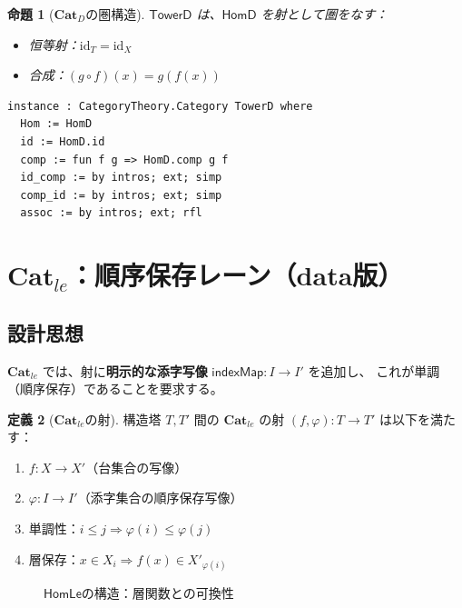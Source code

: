\documentclass[a4paper,11pt]{ltjsarticle}
\theoremstyle{definition}
\newtheorem{definition}{定義}[section]
\theoremstyle{plain}
\newtheorem{proposition}[definition]{命題}
\newcommand{\id}{\mathrm{id}}
\newcommand{\CatD}{\mathbf{Cat}_D}
\newcommand{\Catle}{\mathbf{Cat}_{le}}
\newcommand{\TowerD}{\mathsf{TowerD}}
\newcommand{\HomD}{\mathsf{HomD}}
\newcommand{\HomLe}{\mathsf{HomLe}}
\newcommand{\indexMap}{\mathsf{indexMap}}
\newcommand{\layer}{\mathsf{layer}}
\begin{document}
\begin{proposition}[$\CatD$の圏構造]
$\TowerD$ は、$\HomD$ を射として圏をなす：
\begin{itemize}
  \item 恒等射：$\id_T = \id_X$
  \item 合成：$(g \circ f)(x) = g(f(x))$
\end{itemize}
\end{proposition}

\begin{leancode}
\begin{lstlisting}
instance : CategoryTheory.Category TowerD where
  Hom := HomD
  id := HomD.id
  comp := fun f g => HomD.comp g f
  id_comp := by intros; ext; simp
  comp_id := by intros; ext; simp
  assoc := by intros; ext; rfl
\end{lstlisting}
\end{leancode}

\section{$\Catle$：順序保存レーン（data版）}
\label{sec:cat-le}

\subsection{設計思想}

$\Catle$ では、射に\textbf{明示的な添字写像} $\indexMap : I \to I'$ を追加し、
これが単調（順序保存）であることを要求する。

\begin{definition}[$\Catle$の射]
\label{def:hom-le}
構造塔 $T, T'$ 間の $\Catle$ の射 $(f, \varphi) : T \to T'$ は以下を満たす：
\begin{enumerate}
  \item $f : X \to X'$（台集合の写像）
  \item $\varphi : I \to I'$（添字集合の順序保存写像）
  \item 単調性：$i \leq j \Rightarrow \varphi(i) \leq \varphi(j)$
  \item 層保存：$x \in X_i \Rightarrow f(x) \in X'_{\varphi(i)}$
\end{enumerate}
\end{definition}

\begin{figure}[htbp]
\centering
{}
\caption{$\HomLe$の構造：層関数との可換性}
\label{fig:hom-le}
\end{figure}
\end{document}
